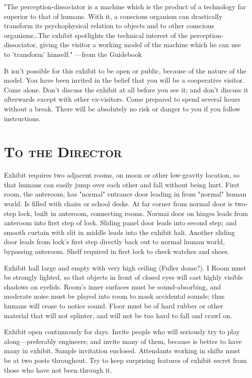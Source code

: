 "The perception-dissociator is a machine which is the product of a 
technology far superior to that of humans. With it, a conscious organism can 
drastically transform its psychophysical relation to objects and to other 
conscious organisms\ldots The exhibit spotlights the technical interest of the 
perception-dissociator, giving the visitor a working model of the machine 
which he can use to 'transform' himself." ---from the Guidebook 

It isn't possible for this exhibit to be open or public, because of the nature of 
the model. You have been invited in the belief that you will be a cooperative 
visitor. Come alone. Don't discuss the exhibit at all before you see it; and 
don't discuss it afterwards except with other ex-visitors. Come prepared to 
spend several hours without a break. There will be absolutely no risk or 
danger to you if you follow instructions. 

\section*{\textsc{To the Director}}

Exhibit requires two adjacent rooms, on moon or other low-gravity 
location, so that humans can easily jump over each other and fall without 
being hurt. First room, the anteroom, has "normal" entrance door leading in 
from "normal" human world. Is filled with chairs or school desks. At far 
corner from normal door is two-step lock, built in anteroom, connecting 
rooms. Normai door on hinges leads from anteroom into first step of lock. 
Sliding panel door leads into second step; and smooth curtain with slit in 
middle leads into the exhibit hali. Another sliding door leads from lock's 
first step directly back out to normal human world, bypassing anteroom. 
Shelf required in first lock to check watches and shoes. 

Exhibit hall large and empty with very high ceiling (Fuller dome?). I 
Room must be strongly lighted, so that objects in front of closed eyes will 
cast highly visible shadows on eyelids. Room's inner surfaces must be 
sound-absorbing, and moderate noise must be played into room to mask 
accidental sounds; thus humans will cease to notice sound. Floor must be of 
hard rubber or other material that will not splinter, and will not be too hard 
to fall and crawl on. 

Exhibit open continuously for days. Invite people who will seriously 
try to play along---preferably engineers; and invite many of them, because 
is better to have many in exhibit. Sample invitation enclosed. Attendants 
working in shifts must be at two posts throughout. Try to keep surprising 
features of exhibit secret from those who have not been through it. 

